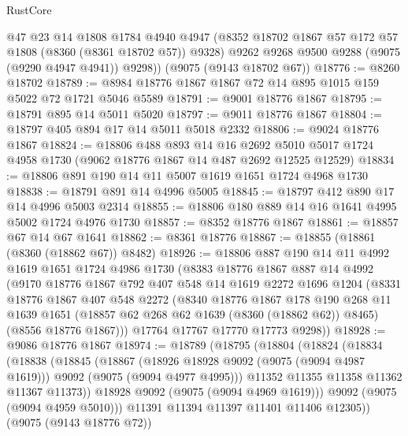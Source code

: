 \begin{lexlean}{RustCore}
\begin{coremodule}
        @47
        @23
        @14
        @1808
        @1784
        @4940
        @4947
        (@8352 @18702 @1867 @57 @172 @57 @1808 (@8360 (@8361 @18702 @57)) @9328)
        @9262
        @9268
        @9500
        @9288
        (@9075 (@9290 @4947 @4941))
        @9298))
    (@9075 (@9143 @18702 @67))
@18776 := @8260 @18702
@18789 := @8984 @18776 @1867 @1867 @72 @14 @895 @1015 @159 @5022 @72 @1721 @5046 @5589
@18791 := @9001 @18776 @1867
@18795 := @18791 @895 @14 @5011 @5020
@18797 := @9011 @18776 @1867
@18804 := @18797 @405 @894 @17 @14 @5011 @5018 @2332
@18806 := @9024 @18776 @1867
@18824 := @18806
    @488
    @893
    @14
    @16
    @2692
    @5010
    @5017
    @1724
    @4958
    @1730
    (@9062 @18776 @1867 @14 @487 @2692 @12525 @12529)
@18834 := @18806 @891 @190 @14 @11 @5007 @1619 @1651 @1724 @4968 @1730
@18838 := @18791 @891 @14 @4996 @5005
@18845 := @18797 @412 @890 @17 @14 @4996 @5003 @2314
@18855 := @18806 @180 @889 @14 @16 @1641 @4995 @5002 @1724 @4976 @1730
@18857 := @8352 @18776 @1867
@18861 := @18857 @67 @14 @67 @1641
@18862 := @8361 @18776
@18867 := @18855 (@18861 (@8360 (@18862 @67)) @8482)
@18926 := @18806
    @887
    @190
    @14
    @11
    @4992
    @1619
    @1651
    @1724
    @4986
    @1730
    (@8383
      @18776
      @1867
      @887
      @14
      @4992
      (@9170
        @18776
        @1867
        @792
        @407
        @548
        @14
        @1619
        @2272
        @1696
        @1204
        (@8331
          @18776
          @1867
          @407
          @548
          @2272
          (@8340
            @18776
            @1867
            @178
            @190
            @268
            @11
            @1639
            @1651
            (@18857 @62 @268 @62 @1639 (@8360 (@18862 @62)) @8465)
            (@8556 @18776 @1867)))
        @17764
        @17767
        @17770
        @17773
        @9298))
@18928 := @9086 @18776 @1867
@18974 := @18789
    (@18795
      (@18804
        (@18824
          (@18834
            (@18838
              (@18845
                (@18867
                  (@18926 @18928 @9092 (@9075 (@9094 @4987 @1619)))
                  @9092
                  (@9075 (@9094 @4977 @4995)))
                @11352
                @11355
                @11358
                @11362
                @11367
                @11373))
            @18928
            @9092
            (@9075 (@9094 @4969 @1619)))
          @9092
          (@9075 (@9094 @4959 @5010)))
        @11391
        @11394
        @11397
        @11401
        @11406
        @12305))
    (@9075 (@9143 @18776 @72))

\end{coremodule}
\end{lexlean}
